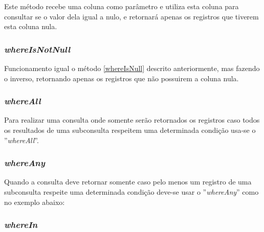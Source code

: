 Este método recebe uma coluna como parâmetro e utiliza esta coluna para consultar se o valor dela igual a nulo, e retornará apenas os registros que tiverem esta coluna nula.

\spaceH{}

\label{scripts/query_with_where_is_null.php}

\subsubsection{\textit{whereIsNotNull}}

Funcionamento igual o método \ref{whereIsNull} descrito anteriormente, mas fazendo o inverso, retornando apenas os registros que não possuirem a coluna nula.



\label{scripts/query_with_where_is_not_null.php}

\subsubsection{\textit{whereAll}}

Para realizar uma consulta onde somente serão retornados os registros caso todos os resultados de uma subconsulta respeitem uma determinada condição usa-se o ''\textit{whereAll}''. 


\label{scripts/query_with_where_all.php}

\subsubsection{\textit{whereAny}}

Quando a consulta deve retornar somente caso pelo menos um registro de uma subconsulta respeite uma determinada condição deve-se usar o ''\textit{whereAny}'' como no exemplo abaixo:

\spaceH{}

\label{scripts/query_with_where_any.php}

\subsubsection{\textit{whereIn}}

